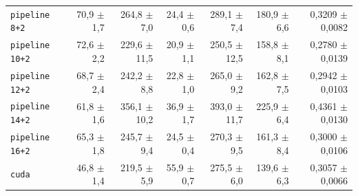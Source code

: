 \begin{tabular}{lrrrrrr}
\texttt{pipeline 8+2} & 70,9 $\pm$ 1,7 & 264,8 $\pm$ 7,0 & 24,4 $\pm$ 0,6 & 289,1 $\pm$ 7,4 & 180,9 $\pm$ 6,6 & 0,3209 $\pm$ 0,0082 \\
\texttt{pipeline 10+2} & 72,6 $\pm$ 2,2 & 229,6 $\pm$ 11,5 & 20,9 $\pm$ 1,1 & 250,5 $\pm$ 12,5 & 158,8 $\pm$ 8,1 & 0,2780 $\pm$ 0,0139 \\
\texttt{pipeline 12+2} & 68,7 $\pm$ 2,4 & 242,2 $\pm$ 8,8 & 22,8 $\pm$ 1,0 & 265,0 $\pm$ 9,2 & 162,8 $\pm$ 7,5 & 0,2942 $\pm$ 0,0103 \\
\texttt{pipeline 14+2} & 61,8 $\pm$ 1,6 & 356,1 $\pm$ 10,2 & 36,9 $\pm$ 1,7 & 393,0 $\pm$ 11,7 & 225,9 $\pm$ 6,4 & 0,4361 $\pm$ 0,0130 \\
\texttt{pipeline 16+2} & 65,3 $\pm$ 1,8 & 245,7 $\pm$ 9,4 & 24,5 $\pm$ 0,4 & 270,3 $\pm$ 9,5 & 161,3 $\pm$ 8,4 & 0,3000 $\pm$ 0,0106 \\
\texttt{cuda} & 46,8 $\pm$ 1,4 & 219,5 $\pm$ 5,9 & 55,9 $\pm$ 0,7 & 275,5 $\pm$ 6,0 & 139,6 $\pm$ 6,3 & 0,3057 $\pm$ 0,0066 \\
\hline
\end{tabular}

